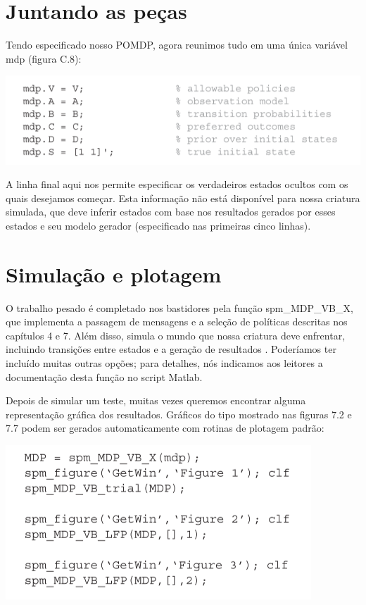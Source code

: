 \documentclass[
  12pt,
]{book}
\begin{document}
\hypertarget{juntando-as-peuxe7as}{%
\section{Juntando as peças}\label{juntando-as-peuxe7as}}

Tendo especificado nosso POMDP, agora reunimos tudo em uma única variável mdp (figura C.8):

\includegraphics{images/Figura_C8.png}

A linha final aqui nos permite especificar os verdadeiros estados ocultos com os quais desejamos começar. Esta informação não está disponível para nossa criatura simulada, que deve inferir estados com base nos resultados gerados por esses estados e seu modelo gerador (especificado nas primeiras cinco linhas).

\hypertarget{simulauxe7uxe3o-e-plotagem}{%
\section{Simulação e plotagem}\label{simulauxe7uxe3o-e-plotagem}}

O trabalho pesado é completado nos bastidores pela função spm\_MDP\_VB\_X, que implementa a passagem de mensagens e a seleção de políticas descritas nos capítulos 4 e 7. Além disso, simula o mundo que nossa criatura deve enfrentar, incluindo transições entre estados e a geração de resultados . Poderíamos ter incluído muitas outras opções; para detalhes, nós indicamos aos leitores a documentação desta função no script Matlab.

Depois de simular um teste, muitas vezes queremos encontrar alguma representação gráfica dos resultados. Gráficos do tipo mostrado nas figuras 7.2 e 7.7 podem ser gerados automaticamente com rotinas de plotagem padrão:

\includegraphics{images/Figura_C9.png}
\end{document}
